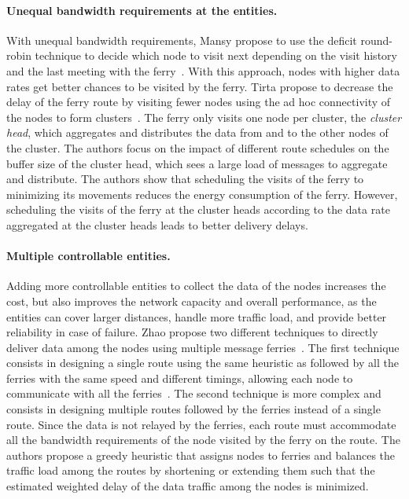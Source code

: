 \paragraph{Unequal bandwidth requirements at the entities.}
With unequal bandwidth requirements, Mansy \etal propose to use the deficit round-robin technique to decide which node to visit next depending on the visit history and the last meeting with the ferry~\cite{mansy2011deficit}. With this approach, nodes with higher data rates get better chances to be visited by the ferry. Tirta \etal propose to decrease the delay of the ferry route by visiting fewer nodes using the ad hoc connectivity of the nodes to form clusters~\cite{tirta2004efficient}. The ferry only visits one node per cluster, the \textit{cluster head}, which aggregates and distributes the data from and to the other nodes of the cluster. The authors focus on the impact of different route schedules on the buffer size of the cluster head, which sees a large load of messages to aggregate and distribute. The authors show that scheduling the visits of the ferry to minimizing its movements reduces the energy consumption of the ferry. However, scheduling the visits of the ferry at the cluster heads according to the data rate aggregated at the cluster heads leads to better delivery delays.

\paragraph{Multiple controllable entities.}
Adding more controllable entities to collect the data of the nodes increases the cost, but also improves the network capacity and overall performance, as the entities can cover larger distances, handle more traffic load, and provide better reliability in case of failure. Zhao \etal propose two different techniques to directly deliver data among the nodes using multiple message ferries~\cite{zhao2005controlling}. The first technique consists in designing a single route using the same heuristic as followed by all the ferries with the same speed and different timings, allowing each node to communicate with all the ferries~\cite{zhao2003message}. The second technique is more complex and consists in designing multiple routes followed by the ferries instead of a single route. Since the data is not relayed by the ferries, each route must accommodate all the bandwidth requirements of the node visited by the ferry on the route. The authors propose a greedy heuristic that assigns nodes to ferries and balances the traffic load among the routes by shortening or extending them such that the estimated weighted delay of the data traffic among the nodes is minimized. 

